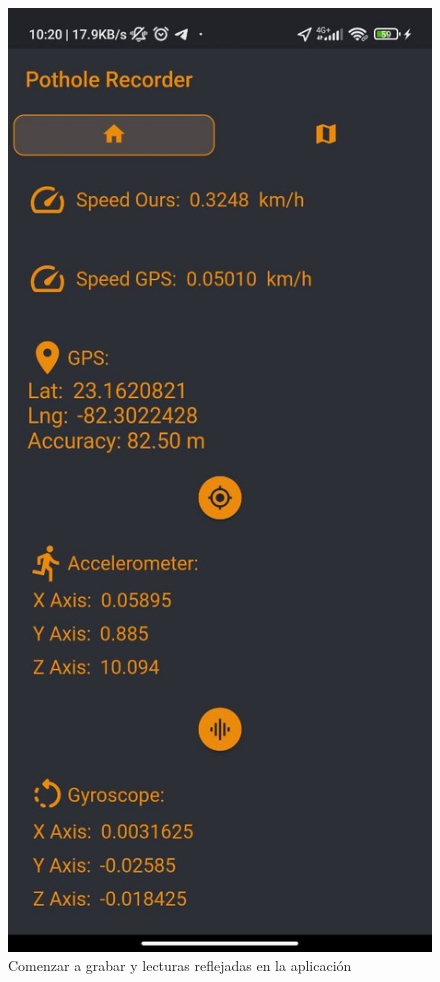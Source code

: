 \begin{figure}[htb]
		\includegraphics[scale = 0.2]{Graphics/apk_recording_sensors.jpg}
		\caption{Comenzar a grabar y lecturas reflejadas en la aplicación}
		\label{fig:6}
	\end{figure}
	\newpage

